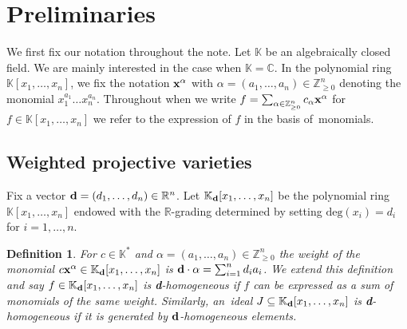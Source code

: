 \documentclass[10pt,a4paper]{amsart}
\newcommand{\thlabel}[1]{\label{#1}}
\newtheorem{Definition}[Theorem]{Definition}
\numberwithin{equation}{section}
\begin{document}
\section{Preliminaries}\label{sec:prep}
We first fix our notation throughout the note. Let $\mathbb{K}$ be an algebraically closed field. We are mainly interested in the case when $\mathbb{K}= \mathbb{C}$. In the polynomial ring $\mathbb K[x_1, \dots , x_n]$, we fix the notation ${\bf x}^\alpha$ with $\alpha=(a_1,\ldots,a_n)\in \mathbb Z_{\ge 0}^n$ denoting the monomial $x_1^{a_1}\dots x_n^{a_n}$.
Throughout when we write $f = \sum_{\alpha\in \mathbb{Z}^n_{\geq 0}} c_{\alpha} {\bf x}^{\alpha}$ for $f \in \mathbb K[x_1, \dots , x_n]$ we refer to the expression of $f$ in the basis of~monomials.

\subsection{Weighted projective varieties}
Fix a vector $ {\bf d}=(d_1, \dots , d_n)\in \mathbb R^n$.
Let $\mathbb K_{\bf d}[x_1, \dots , x_n]$ be the polynomial ring $\mathbb K [x_1, \dots , x_n]$ endowed with the $\mathbb R$-grading determined by setting $\text{deg} (x_i)=d_i$ for $i = 1, \dots , n$.

\begin{Definition}\thlabel{def:d homog}
For $c \in \mathbb K^{\ast}$ and $ \alpha=(a_1,\dots , a_n) \in \mathbb Z_{\geq 0}^n$ the {\it weight} of the monomial $ c {\bf x}^{\alpha}\in \mathbb K_{\bf d}[x_1, \dots , x_n]$ is ${\bf d}\cdot \alpha = \sum_{i=1}^nd_ia_i$.
We extend this definition and say $f \in \mathbb K_{\bf d}[x_1, \dots , x_n]$ is {\bf d}-{\it homogeneous} if $f$ can be expressed as a sum of monomials of the same weight.
Similarly, an~ideal $J\subseteq \mathbb K_{\bf d}[x_1, \dots , x_n]$ is {\bf d}-{\it homogeneous} if it is generated by ${\bf d}$-homogeneous elements.
\end{Definition}
\end{document}

